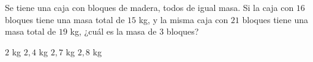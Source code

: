 \documentclass[
  titulo=Prueba,
  subtitulo=Álgebra y funciones,
  curso=Tercero medio B,
  fecha=2025-09-26,
  con nombre,
  ppp=1
]{srs3}
\begin{document}
\begin{preguntas}
\pregunta Se tiene una caja con bloques de madera, todos de igual masa. Si la caja con \(16\) bloques tiene una masa total de \(15\) kg, y la misma caja con \(21\) bloques tiene una masa total de \(19\) kg, ¿cuál es la masa de \(3\) bloques?
\begin{alternativas}
\alternativa \(2\) kg
\alternativa \(2,4\) kg
\alternativa \(2,7\) kg
\alternativa \(2,8\) kg
\end{alternativas}



\end{preguntas}
\end{document}
